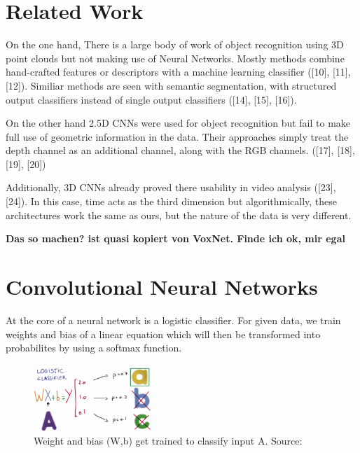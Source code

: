 \documentclass[10pt,twocolumn,letterpaper]{article}
\begin{document}

\section{Related Work}

On the one hand, There is a large body of work of object recognition using 3D point clouds but not making use of Neural Networks. 
Mostly methods combine hand-crafted features or descriptors with a machine learning classifier ([10], [11], [12]). 
Similiar methods are seen with semantic segmentation, with structured output classifiers instead of single output classifiers ([14], [15], [16]).

On the other hand 2.5D CNNs were used for object recognition but fail to make full use of geometric information in the data. Their approaches simply treat the depth channel as an additional channel, along with the RGB channels. ([17], [18], [19], [20]) 

Additionally, 3D CNNs already proved there usability in video analysis ([23], [24]). In this case, time acts as the third dimension but algorithmically, these architectures work the same as ours, but the nature of the data is very different.

\textbf{Das so machen? ist quasi kopiert von VoxNet. Finde ich ok, mir egal}

\section{Convolutional Neural Networks}

At the core of a neural network is a logistic classifier. 
For given data, we train weights and bias of a linear equation which will then be transformed into 
probabilites by using a softmax function. 

\begin{figure}[h]
	\label{fig:classifier}
	\centering
	\includegraphics[width=0.4\textwidth]{classifier}
	\caption{Weight and bias (W,b) get trained to classify input A. Source: \cite{udacity}}
\end{figure}
\end{document}
